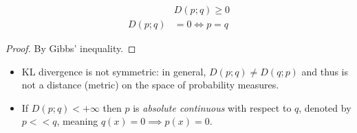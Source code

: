 \documentclass[toc, titlepaged]{../cs-classes/cs-classes}
\begin{document}
\begin{property}[Positivity]
    \begin{equation*}
        \begin{aligned}
        &D(p; q) \geq 0\\
        D(p; q) &= 0\iff p=q
        \end{aligned}
    \end{equation*}
\end{property}
\begin{proof}
    By Gibbs' inequality.
\end{proof}

\begin{remark}
    \leavevmode
    \begin{itemize}
        \item KL divergence is not symmetric: in general, $D(p; q)\neq D(q; p)$ and thus is not a distance (metric) on the space of probability measures.
        \item If $D(p; q)<+\infty$ then $p$ is \emph{absolute continuous} with respect to $q$, denoted by $p << q$, meaning $q(x)=0 \implies p(x)=0$.
    \end{itemize}
\end{remark}
\end{document}
